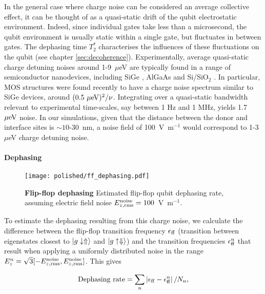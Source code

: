 In the general case where charge noise can be considered an average collective effect, it can be thought of as a quasi-static drift of the qubit electrostatic environment. Indeed, since individual gates take less than a microsecond, the qubit environment is usually static within a single gate, but fluctuates in between gates. The dephasing time $T_2^*$ characterises the influences of these fluctuations on the qubit (see chapter \ref{sec:decoherence}). Experimentally, average quasi-static charge detuning noises around 1-9~$\mu$eV are typically found in a range of semiconductor nanodevices, including SiGe \cite{Kim2015,Thorgrimsson2017,Freeman2017}, AlGaAs \cite{Dial2013} and Si/SiO$_2$ \cite{Harvey-Collard2017,Freeman2017}. In particular, MOS structures were found recently \cite{Freeman2017} to have a charge noise spectrum similar to SiGe devices, around $(0.5~{\mu \rm eV})^2/\nu$. Integrating over a quasi-static bandwidth relevant to experimental time-scales, say between 1 Hz  and 1 MHz, yields 1.7~${\mu \rm eV}$ noise. In our simulations, given that the distance between the donor and interface sites is $\sim10$-30~nm, a noise field of 100~V~m$^{-1}$ would correspond to 1-3~$\mu$eV charge detuning noise. 

\paragraph{Dephasing}

\begin{figure}[h]
	\centering
	\texttt{[image: polished/ff\_dephasing.pdf]}
	\caption[Flip-flop dephasing]{\textbf{Flip-flop dephasing} Estimated flip-flop qubit dephasing rate, assuming electric field noise $E_{z, \rm rms}^{\rm noise}=100$~V~m$^{-1}$.}
	\label{fig:ff_dephasing}
\end{figure}

To estimate the dephasing resulting from this charge noise, we calculate the difference between the flip-flop transition frequency $\epsilon_{\rm ff}$ (transition between eigenstates closest to $\ket{g\downarrow\Uparrow}$ and $\ket{g\uparrow\Downarrow}$) and the transition frequencies $\epsilon_{\rm ff}^n$ that result when applying a uniformly distributed noise in the range $E_z^n=\sqrt{3}[-E_{z,\rm rms}^{\rm noise},E_{z,\rm rms}^{\rm noise}]$. This gives 

\begin{equation} \label{eq:dephasing_rate}
{\rm Dephasing~rate}=\sum\limits_{n}{\left|\epsilon_{\rm ff}-\epsilon_{\rm ff}^n\right|/N_n},
\end{equation}

